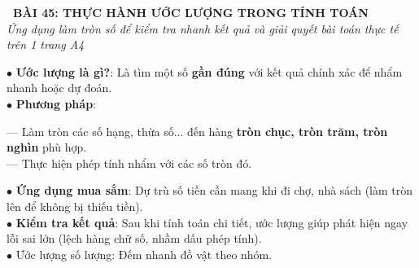 \documentclass[14pt,a4paper,oneside]{extbook}
\begin{document}
\noindent
\begin{tcolorbox}[
  enhanced,
  colback=teal!8!white,
  colframe=teal!80!black,
  arc=3mm, boxrule=1pt,
  left=3mm, right=3mm, top=2mm, bottom=2mm,
  halign=center
]
  {\Large\bfseries\color{teal!90!black}\faBookmark\ BÀI 45: THỰC HÀNH ƯỚC LƯỢNG TRONG TÍNH TOÁN}\\[1.5pt]
  {\footnotesize\itshape\color{black!75} Ứng dụng làm tròn số để kiểm tra nhanh kết quả và giải quyết bài toán thực tế trên 1 trang A4}
\end{tcolorbox}

\vspace{2mm}

\noindent
\begin{minipage}[t]{0.49\textwidth}
  \begin{tcolorbox}[
    enhanced,
    title={\footnotesize\bfseries\color{white}\faCalculator\ 1. Bản chất của ước lượng},
    colback=blue!2!white,
    colframe=blue!75!black,
    arc=2.5mm, boxrule=0.8pt, top=1.8mm, bottom=1.8mm, left=2mm, right=2mm
  ]
    \footnotesize
    $\bullet$ \textbf{Ước lượng là gì?}: Là tìm một số \textbf{gần đúng} với kết quả chính xác để nhẩm nhanh hoặc dự đoán.\\
    $\bullet$ \textbf{Phương pháp}:
    \par
    --- Làm tròn các số hạng, thừa số... đến hàng \textbf{tròn chục, tròn trăm, tròn nghìn} phù hợp.\\
    --- Thực hiện phép tính nhẩm với các số tròn đó.
  \end{tcolorbox}
\end{minipage}%
\hfill
\begin{minipage}[t]{0.49\textwidth}
  \begin{tcolorbox}[
    enhanced,
    title={\footnotesize\bfseries\color{white}\faShoppingBag\ 2. Ứng dụng thực tiễn},
    colback=teal!2!white,
    colframe=teal!75!black,
    arc=2.5mm, boxrule=0.8pt, top=1.8mm, bottom=1.8mm, left=2mm, right=2mm
  ]
    \footnotesize
    $\bullet$ \textbf{Ứng dụng mua sắm}: Dự trù số tiền cần mang khi đi chợ, nhà sách (làm tròn lên để không bị thiếu tiền).\\
    $\bullet$ \textbf{Kiểm tra kết quả}: Sau khi tính toán chi tiết, ước lượng giúp phát hiện ngay lỗi sai lớn (lệch hàng chữ số, nhầm dấu phép tính).\\
    $\bullet$ Ước lượng số lượng: Đếm nhanh đồ vật theo nhóm.
  \end{tcolorbox}
\end{minipage}
\end{document}
